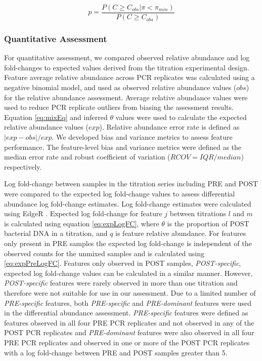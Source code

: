 \documentclass{bmcart}
\begin{document}
\begin{equation}
    p = \frac{P(C \geq C_{obs}| \pi < \pi_{min})}{P(C \geq C_{obs})}
  \label{eq:bht2}
\end{equation}



\subsubsection*{Quantitative Assessment}
For quantitative assessment, we compared observed relative abundance and
log fold-changes to expected values derived from the titration
experimental design.
Feature average relative abundance across PCR
replicates was calculated using a negative binomial model, and used as
observed relative abundance values (\(obs\)) for the relative abundance
assessment. Average relative abundance values were used to reduce PCR
replicate outliers from biasing the assessment results. Equation
\eqref{eq:mixEq} and inferred \(\theta\) values were used to calculate the
expected relative abundance values (\(exp\)). Relative abundance error
rate is defined as \(|exp - obs|/exp\).
We developed bias and variance metrics to assess feature performance.
The feature-level bias and variance metrics were defined as the median
error rate and robust coefficient of variation (\(RCOV=IQR/median\))
respectively.

Log fold-change between samples in the titration series including PRE
and POST were compared to the expected log fold-change values to assess
differential abundance log fold-change estimates. Log fold-change
estimates were calculated using EdgeR
\cite{Robinson2010, McCarthy2012}. Expected log fold-change for feature
\(j\) between titrations \(l\) and \(m\) is calculated using equation
\eqref{eq:expLogFC}, where \(\theta\) is the proportion of POST bacterial
DNA in a titration, and \(q\) is feature relative abundance. For
features only present in PRE samples the expected log fold-change is
independent of the observed counts for the unmixed samples and is
calculated using \eqref{eq:expPreLogFC}. Features only observed in POST
samples, \emph{POST-specific}, expected log fold-change values can be
calculated in a similar manner. However, \emph{POST-specific} features
were rarely observed in more than one titration and therefore were not
suitable for use in our assessment. Due to a limited number of
\emph{PRE-specific} features, both \emph{PRE-specific} and
\emph{PRE-dominant} features were used in the differential abundance
assessment. \emph{PRE-specific} features were defined as features
observed in all four PRE PCR replicates and not observed in any of the
POST PCR replicates and \emph{PRE-dominant} features were also observed
in all four PRE PCR replicates and observed in one or more of the POST
PCR replicates with a log fold-change between PRE and POST samples
greater than 5.
\end{document}

